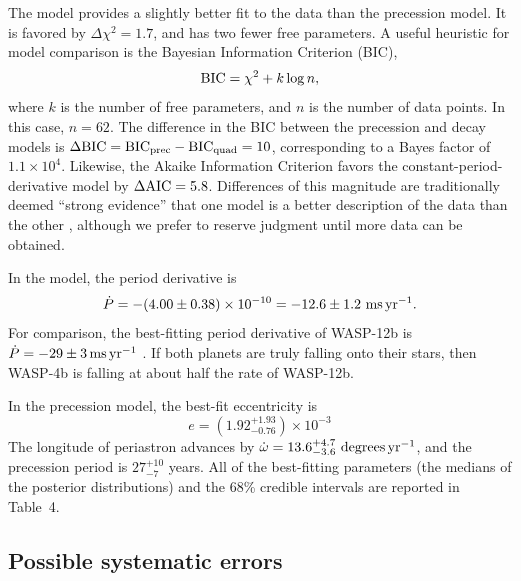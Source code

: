 \documentclass[12pt,twocolumn,tighten]{aastex62}
\begin{document}
The  model provides a slightly
better fit to the data than the precession model.  It is favored by
$\Delta \chi^2 = 1.7$, and has two fewer free parameters.  A useful
heuristic for model comparison is the Bayesian Information Criterion
(BIC),
\begin{equation}
  {\rm BIC} = \chi^2 + k\log n,
\end{equation}
where $k$ is the number of free parameters, and $n$ is the number of
data points. In this case, $n=62$.  The difference in the BIC between
the precession and decay models is $\Delta {\rm BIC} = {\rm BIC}_{\rm
prec} - {\rm BIC}_{\rm quad} = 10$, corresponding to a Bayes factor of
$1.1\times 10^{4}$.  Likewise, the Akaike Information Criterion favors
the constant-period-derivative model by $\Delta {\rm AIC} = 5.8$.
Differences of this magnitude are traditionally deemed ``strong
evidence'' that one model is a better description of the data than the
other \citep{kass_bayes_1995}, although we prefer to reserve judgment
until more data can be obtained.

In the  model, the period
derivative is
\begin{equation}
\dot{P}
  = - (4.00 \pm 0.38)\times 10^{-10}
  = - 12.6 \pm 1.2~{\rm ms}\,{\rm yr}^{-1}.
  \label{eq:dP_dt_obs}
\end{equation}
For comparison, the best-fitting period derivative of WASP-12b is
$\dot{P} = -29 \pm 3\,{\rm ms}\,{\rm yr}^{-1}$
\citep{maciejewski_departure_2016,patra_2017}.  If both planets are
truly falling onto their stars, then WASP-4b is falling at about half
the rate of WASP-12b.

In the precession model, the best-fit eccentricity is
\begin{equation}
  e = (1.92^{+ 1.93}_{- 0.76})\times10^{-3}
  \label{eq:e_obs}
\end{equation}
The longitude of periastron advances by $\dot{\omega} =
13.6^{+4.7}_{-3.6}\ {\rm degrees}\,{\rm yr}^{-1}$, and the precession
period is $27^{+10}_{-7}$ years.  All of the best-fitting parameters
(the medians of the posterior distributions) and the 68\% credible
intervals are reported in Table~4.

\subsection{Possible systematic errors}
\end{document}

